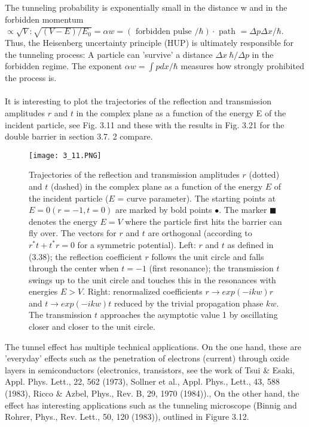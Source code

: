 The tunneling probability is exponentially small in the distance w and in the forbidden momentum $\propto \sqrt{V}: \sqrt{(V - E) / E_0} = \alpha w = (\text{ forbidden pulse }/\hbar) · \text{ path } = ΔpΔx / \hbar$. Thus, the Heisenberg uncertainty principle (HUP) is ultimately responsible for the tunneling process: A particle can 'survive' a distance $Δx ~ \hbar / Δp$ in the forbidden regime. The exponent $\alpha w = \int p dx / \hbar$ measures how strongly prohibited the process is.\\\\
It is interesting to plot the trajectories of the reflection and transmission amplitudes $r$ and $t$ in the complex plane as a function of the energy E of the incident particle, see Fig. 3.11 and these with the results in Fig. 3.21 for the double barrier in section 3.7. 2 compare.
\begin{figure}[ht]
    \centering
    \texttt{[image: 3\_11.PNG]}
    \caption{Trajectories of the reflection and transmission amplitudes $r$ (dotted) and $t$ (dashed) in the complex plane as a function of the energy $E$ of the incident particle ($E$ = curve parameter). The starting points at$ E = 0 (r = -1, t = 0)$ are marked by bold points $\bullet$. The marker $\blacksquare$ denotes the energy $E = V$ where the particle first hits the barrier can fly over. The vectors for $r$ and $t$ are orthogonal (according to $r^*t+t^*r=0$ for a symmetric potential). Left: $r$ and $t$ as defined in (3.38); the reflection coefficient $r$ follows the unit circle and falls through the center when $t = -1$ (first resonance); the transmission $t$ swings up to the unit circle and touches this in the resonances with energies $E> V$. Right: renormalized coefficients $r \to exp (-ikw) r$ and $t \to exp (-ikw) t$ reduced by the trivial propagation phase $kw$. The transmission $t$ approaches the asymptotic value 1
    by oscillating closer and closer to the unit circle.}
\end{figure}
The tunnel effect has multiple technical applications. On the one hand, these are 'everyday' effects such as the penetration of electrons (current) through oxide layers in semiconductors (electronics, transistors, see the work of Tsui \& Esaki, Appl. Phys. Lett., 22, 562 (1973), Sollner et al., Appl. Phys., Lett., 43, 588 (1983), Ricco \& Azbel, Phys., Rev. B, 29, 1970 (1984))., On the other hand, the effect has interesting applications such as the tunneling microscope (Binnig and Rohrer, Phys., Rev. Lett., 50, 120 (1983)), outlined in Figure 3.12.

